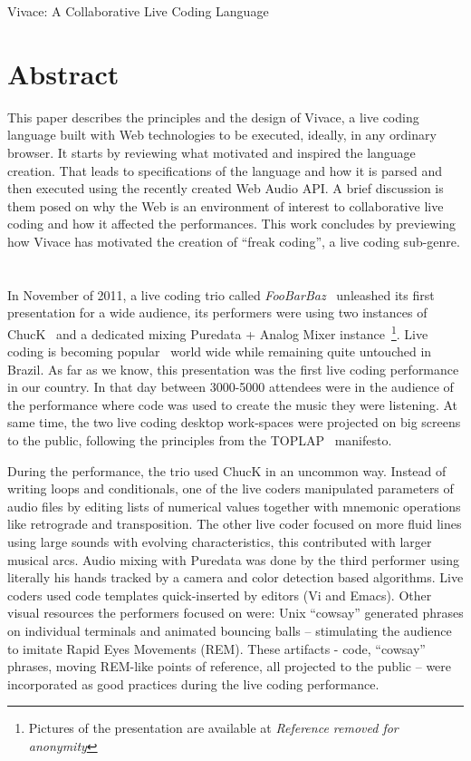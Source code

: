 \documentclass[letterpaper, 12pt]{article}
\begin{document}
\vspace*{24pt}

{\cmjTitle Vivace: A Collaborative Live Coding Language}

\section*{Abstract}

This paper describes the principles and the design of Vivace, a live
coding language built with Web technologies to be executed, ideally,
in any ordinary browser. It starts by reviewing what motivated and
inspired the language creation. That leads to specifications of the
language and how it is parsed and then executed using the recently
created Web Audio API. A brief discussion is them posed on why the Web
is an environment of interest to collaborative live coding and how it
affected the performances. This work concludes by previewing how
Vivace has motivated the creation of ``freak coding'', a live coding
sub-genre.

\section*{}

In November of 2011, a live coding trio called
\textit{FooBarBaz}~\citep{foobarbaz} unleashed its first presentation
for a wide audience, its performers were using two instances of
ChucK~\citep{wang2003chuck} and a dedicated mixing Puredata + Analog
Mixer instance~\footnote{Pictures of the presentation are available at
  \textit{Reference removed for anonymity}}. Live
coding is becoming popular~\citep{nilson2007live, collins2003live,
  brown2007a, collins2011live} world wide while remaining quite
untouched in Brazil. As far as we know, this presentation was the
first live coding performance in our country. In that day between
3000-5000 attendees were in the audience of the performance where code
was used to create the music they were listening. At same time, the
two live coding desktop work-spaces were projected on big screens to
the public, following the principles from the
TOPLAP~\citep{ward2004live} manifesto.

During the performance, the trio used ChucK in an uncommon
way. Instead of writing loops and conditionals, one of the live coders
manipulated parameters of audio files by editing lists of numerical
values together with mnemonic operations like retrograde and
transposition. The other live coder focused on more fluid lines using
large sounds with evolving characteristics, this contributed with
larger musical arcs. Audio mixing with Puredata was done by the third
performer using literally his hands tracked by a camera and color
detection based algorithms. Live coders used code templates
quick-inserted by editors (Vi and Emacs). Other visual resources the
performers focused on were: Unix ``cowsay'' generated phrases on
individual terminals and animated bouncing balls -- stimulating the
audience to imitate Rapid Eyes Movements (REM). These artifacts -
code, ``cowsay'' phrases, moving REM-like points of reference, all
projected to the public -- were incorporated as good practices during
the live coding performance.
\end{document}
